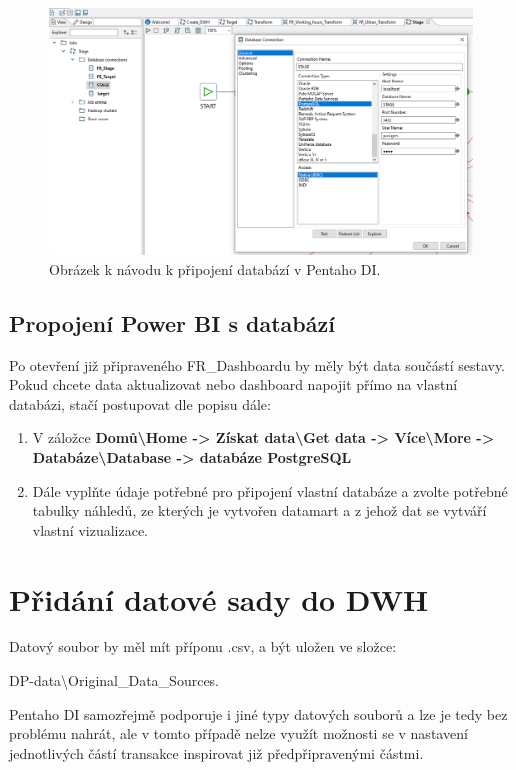 \documentclass[thesis=M,czech]{FITthesis}[2022/10/08]
\begin{document}
\begin{figure}
    \centering
    \includegraphics[width=\textwidth]{DP-obrazky/nastaveni_databaze.png}
    \caption{Obrázek k návodu k připojení databází v Pentaho DI.}
    \label{fig:Pentaho_database}
\end{figure}

\subsection{Propojení Power BI s databází}
Po otevření již připraveného FR\_Dashboardu by měly být data součástí sestavy. Pokud chcete data aktualizovat nebo dashboard napojit přímo na vlastní databázi, stačí postupovat dle popisu dále:
\begin{enumerate}
    \item V záložce \textbf{Domů\textbackslash Home -> Získat data\textbackslash Get data -> Více\textbackslash More -> Databáze\textbackslash Database -> databáze PostgreSQL}
    \item Dále vyplňte údaje potřebné pro připojení vlastní databáze a zvolte potřebné tabulky náhledů, ze kterých je vytvořen datamart a z jehož dat se vytváří vlastní vizualizace.
\end{enumerate}

\section{Přidání datové sady do DWH}
Datový soubor by měl mít příponu .csv, a být uložen ve složce:

DP-data\textbackslash Original\_Data\_Sources.

Pentaho DI samozřejmě podporuje i jiné typy datových souborů a lze je tedy bez problému nahrát, ale v tomto případě nelze využít možnosti se v nastavení jednotlivých částí transakce inspirovat již předpřipravenými částmi. 
\end{document}
